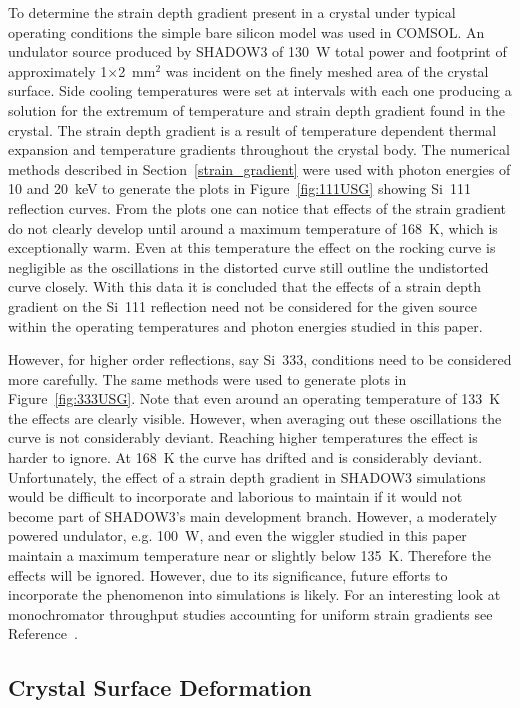 \documentclass[preprint]{iucr}              %
\begin{document}
To determine the strain depth gradient present in a crystal under typical operating conditions the simple bare silicon model was used in COMSOL. An undulator source produced by SHADOW3 of 130~W total power and footprint of approximately 1$\times$2~mm$^2$ was incident on the finely meshed area of the crystal surface. Side cooling temperatures were set at intervals with each one producing a solution for the extremum of temperature and strain depth gradient found in the crystal. The strain depth gradient is a result of temperature dependent thermal expansion and temperature gradients throughout the crystal body. The numerical methods described in Section~\ref{strain_gradient} were used with photon energies of 10 and 20~keV to generate the plots in Figure~\ref{fig:111USG} showing Si~111 reflection curves. From the plots one can notice that effects of the strain gradient do not clearly develop until around a maximum temperature of 168~K, which is exceptionally warm. Even at this temperature the effect on the rocking curve is negligible as the oscillations in the distorted curve still outline the undistorted curve closely. With this data it is concluded that the effects of a strain depth gradient on the Si~111 reflection need not be considered for the given source within the operating temperatures and photon energies studied in this paper.

However,  for higher order reflections, say Si~333, conditions need to be considered more carefully. The same methods were used to generate plots in Figure~\ref{fig:333USG}. Note that even around an operating temperature of 133~K the effects are clearly visible. However, when averaging out these oscillations the curve is not considerably deviant. Reaching higher temperatures the effect is harder to ignore. At 168~K the curve has drifted and is considerably deviant. Unfortunately, the effect of a strain depth gradient in SHADOW3 simulations would be difficult to incorporate and laborious to maintain if it would not become part of SHADOW3's main development branch. However, a moderately powered undulator, e.g. 100~W, and even the wiggler studied in this paper maintain a maximum temperature near or slightly below 135~K. Therefore the effects will be ignored. However, due to its significance, future efforts to incorporate the phenomenon into simulations is likely. For an interesting look at monochromator throughput studies accounting for uniform strain gradients see Reference~\cite{mocellaUSG}.

\subsection{Crystal Surface Deformation}\label{deformation}
\end{document}
